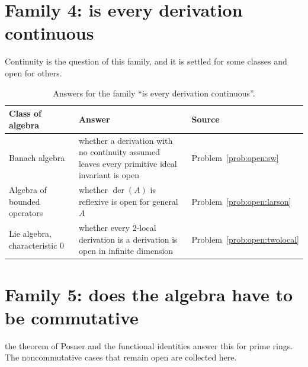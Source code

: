 \section{Family 4: is every derivation continuous}

Continuity is the question of this family, and it is settled for some classes %
and open for others. %

\begin{table}[htbp]
  \centering
  \caption{Answers for the family ``is every derivation continuous''.}
  \label{tab:q:continuity}
  \begin{tabular}{p{}p{}p{}}
    \toprule
    Class of algebra & Answer & Source \\ %
    \midrule
    Banach algebra & whether a derivation with no continuity assumed leaves %
      every primitive ideal invariant is open & Problem~\ref{prob:open:sw} \\ %
    Algebra of bounded operators & whether $\operatorname{der}(A)$ is %
      reflexive is open for general $A$ & Problem~\ref{prob:open:larson} \\ %
    Lie algebra, characteristic $0$ & whether every 2-local derivation is a %
      derivation is open in infinite dimension & %
      Problem~\ref{prob:open:twolocal} \\ %
    \bottomrule
  \end{tabular}
\end{table}

\section{Family 5: does the algebra have to be commutative}

the theorem of Posner and the functional identities answer this for prime rings. %
The noncommutative cases that remain open are collected here. %

